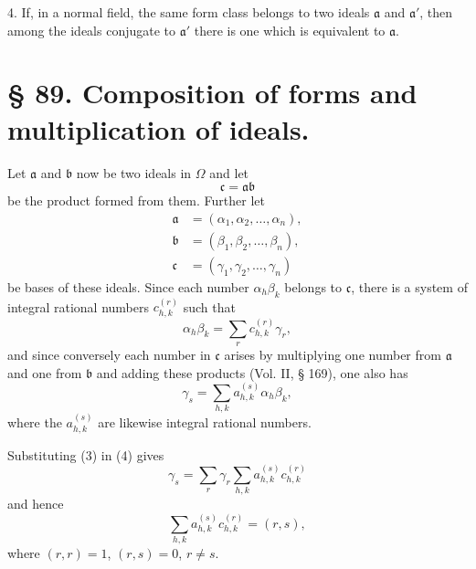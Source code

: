 \documentclass[11pt]{article}
\begin{document}
4. If, in a normal field, the same form class belongs to two ideals $\mathfrak a$ and $\mathfrak a'$, then among the ideals conjugate to $\mathfrak a'$ there is one which is equivalent to $\mathfrak a$.

\section*{§ 89. Composition of forms and multiplication of ideals.}

Let $\mathfrak a$ and $\mathfrak b$ now be two ideals in $\Omega$ and let
\begin{equation}
 \mathfrak c=\mathfrak a\mathfrak b\tag{1}
\end{equation}
be the product formed from them. Further let
\begin{equation}
\begin{aligned}
 \mathfrak a&=(\alpha_1,\alpha_2,
\ldots,\alpha_n),\\
 \mathfrak b&=(\beta_1,\beta_2,
\ldots,\beta_n),\\
 \mathfrak c&=(\gamma_1,\gamma_2,
\ldots,\gamma_n)
\end{aligned}\tag{2}
\end{equation}
be bases of these ideals. Since each number $\alpha_h\beta_k$ belongs to $\mathfrak c$, there is a system of integral rational numbers $c_{h,k}^{(r)}$ such that
\begin{equation}
 \alpha_h\beta_k=\sum_r c_{h,k}^{(r)}\gamma_r,\tag{3}
\end{equation}
and since conversely each number in $\mathfrak c$ arises by multiplying one number from $\mathfrak a$ and one from $\mathfrak b$ and adding these products (Vol. II, § 169), one also has
\begin{equation}
 \gamma_s=\sum_{h,k}a_{h,k}^{(s)}\alpha_h\beta_k,\tag{4}
\end{equation}
where the $a_{h,k}^{(s)}$ are likewise integral rational numbers.

Substituting (3) in (4) gives
\begin{equation}
 \gamma_s=\sum_r\gamma_r\sum_{h,k}a_{h,k}^{(s)}c_{h,k}^{(r)}\tag{5}
\end{equation}
and hence
\begin{equation}
 \sum_{h,k}a_{h,k}^{(s)}c_{h,k}^{(r)}=(r,s),\tag{6}
\end{equation}
where $(r,r)=1$, $(r,s)=0$, $r\ne s$.
\end{document}
